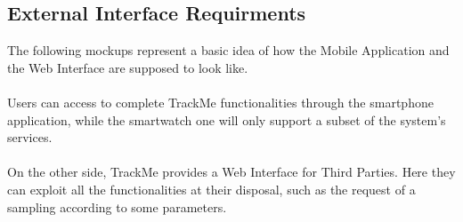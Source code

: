 \documentclass[12pt,a4paper]{article}
\begin{document}
		\subsection{External Interface Requirments}
			The following mockups represent a basic idea of how the Mobile Application and the Web Interface are supposed to look like.
			\\ \\
			Users can access to complete TrackMe functionalities through the smartphone application, while the smartwatch one will only support a subset of the system's services.
			\\ \\
			On the other side, TrackMe provides a Web Interface for Third Parties. Here they can exploit all the functionalities at their disposal, such as the request of a sampling according to some parameters.
\end{document}
